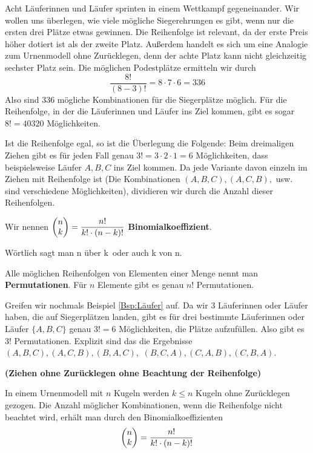 \documentclass[ngerman, 12pt]{nssheetxea}
\begin{document}
\begin{example}
Acht Läuferinnen und Läufer sprinten in einem Wettkampf gegeneinander. Wir wollen uns überlegen, wie viele mögliche Siegerehrungen es gibt, wenn nur die ersten drei Plätze etwas gewinnen. Die Reihenfolge ist relevant, da der erste Preis höher dotiert ist als der zweite Platz. Außerdem handelt es sich um eine Analogie zum Urnenmodell ohne Zurücklegen, denn der achte Platz kann nicht gleichzeitig sechster Platz sein. Die möglichen Podestplätze ermitteln wir durch
\[ \dfrac{8!}{(8-3)!} = 8 \cdot 7 \cdot 6 = 336\]
Also sind 336 mögliche Kombinationen für die Siegerplätze möglich. Für die Reihenfolge, in der die Läuferinnen und Läufer ins Ziel kommen, gibt es sogar $8!=40320$ Möglichkeiten.
\label{Bsp:Läufer}
\end{example}

Ist die Reihenfolge egal, so ist die Überlegung die Folgende: Beim dreimaligen Ziehen gibt es für jeden Fall genau $3!=3\cdot 2 \cdot 1 = 6$ Möglichkeiten, dass beispielsweise Läufer $A,B,C$ ins Ziel kommen. Da jede Variante davon einzeln im Ziehen mit Reihenfolge ist (Die Kombinationen $(A,B,C), (A,C,B),$ usw. sind verschiedene Möglichkeiten), dividieren wir durch die Anzahl dieser Reihenfolgen. 

\begin{definition} Wir nennen $\colvec{n}{k}=\dfrac{n!}{k! \cdot (n-k)!}$ \textbf{Binomialkoeffizient}. \par
Wörtlich sagt man \glqq n über k\grqq \ oder auch \glqq k von n\grqq.
\end{definition} 

\begin{definition}
Alle möglichen Reihenfolgen von Elementen einer Menge nennt man \textbf{Permutationen}. Für $n$ Elemente gibt es genau $n!$ Permutationen. 
\end{definition}

\begin{example}
Greifen wir nochmals Beispiel \ref{Bsp:Läufer} auf. Da wir $3$ Läuferinnen oder Läufer haben, die auf Siegerplätzen landen, gibt es für drei bestimmte Läuferinnen oder Läufer $\{A,B,C\}$ genau $3!=6$ Möglichkeiten, die Plätze aufzufüllen. Also gibt es $3!$ Permutationen. Explizit sind das die Ergebnisse $(A,B,C), (A,C,B), (B,A,C),$ $(B,C,A), (C,A,B), (C,B,A)$.
\end{example}

\begin{theorem} \textbf{(Ziehen ohne Zurücklegen ohne Beachtung der Reihenfolge)} \par
In einem Urnenmodell mit $n$ Kugeln werden $k\leq n$ Kugeln ohne Zurücklegen gezogen. Die Anzahl möglicher Kombinationen, wenn die Reihenfolge nicht beachtet wird, erhält man durch den Binomialkoeffizienten
\[ \colvec{n}{k}=\dfrac{n!}{k! \cdot (n-k)!}  \]
\end{theorem}
\end{document}
